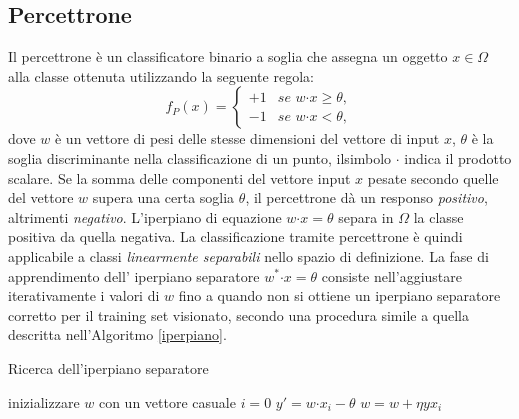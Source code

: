 \documentclass [11pt,a4paper,twoside,openright] {book}
\begin{document}
\subsection{Percettrone}
Il percettrone \cite{rosenblatt1958perceptron} è un classificatore binario a soglia che assegna un oggetto $x \in \Omega$ alla classe ottenuta utilizzando la seguente regola:
\begin{equation}
f_P(x)=
\begin{cases}
+1 & \textit{se } w \boldsymbol{\cdot} x \geq \theta, \\
-1 & \textit{se } w \boldsymbol{\cdot} x < \theta,
\end{cases}
\end{equation}
dove $w$ è un vettore di pesi delle stesse dimensioni del vettore di input $x$, $\theta$ è la soglia discriminante nella classificazione di un punto, ilsimbolo $\boldsymbol{\cdot}$ indica il prodotto scalare. Se la somma delle componenti del vettore input $x$ pesate secondo quelle del vettore $w$ supera una certa soglia $\theta$, il percettrone dà un responso \textit{positivo}, altrimenti \textit{negativo}. L'iperpiano di equazione $w \boldsymbol{\cdot} x = \theta$ separa in $\Omega$ la classe positiva da quella negativa. La classificazione tramite percettrone è quindi applicabile a classi \textit{linearmente separabili} nello spazio di definizione. La fase di apprendimento dell' iperpiano separatore $w^* \boldsymbol{\cdot} x = \theta$ consiste nell'aggiustare iterativamente i valori di $w$ fino a quando non si ottiene un iperpiano separatore corretto per il training set visionato, secondo una procedura simile a quella descritta nell'Algoritmo \ref{iperpiano}.
\begin{algorithm}
\caption{Ricerca dell'iperpiano separatore}\label{iperpiano}
\begin{algorithmic}[1]
\State inizializzare $w$ con un vettore casuale
	\State $i=0$
		\State $y' = w \boldsymbol{\cdot} x_i - \theta$
		 $w = w + \eta y x_i$ \EndIf
	\EndWhile
\EndWhile
\end{algorithmic}
\end{algorithm}
\end{document}
